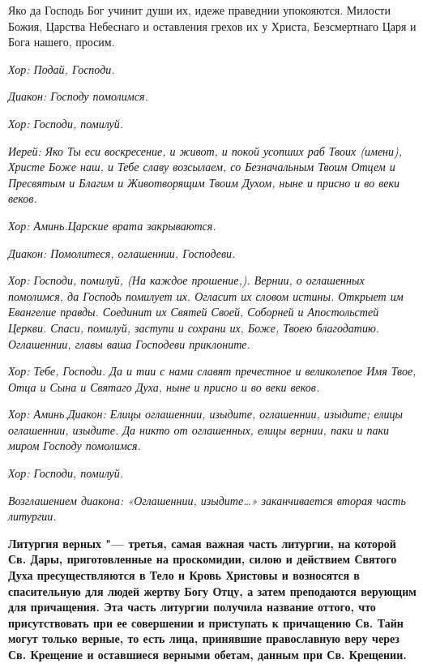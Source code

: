 Яко да Господь Бог учинит души их, идеже праведнии упокояются. Милости Божия, Царства Небеснаго и оставления грехов их у Христа, Безсмертнаго Царя и Бога нашего, просим.


\itshape Хор:\normalfont{} Подай, Господи.


\itshape Диакон:\normalfont{} Господу помолимся.


\itshape Хор:\normalfont{} Господи, помилуй.


\itshape Иерей:\normalfont{} Яко Ты еси воскресение, и живот, и покой усопших раб Твоих \itshape (имени)\normalfont{}, Христе Боже наш, и Тебе славу возсылаем, со Безначальным Твоим Отцем и Пресвятым и Благим и Животворящим Твоим Духом, ныне и присно и во веки веков.


\itshape Хор\normalfont{}: Аминь.\itshape  Царские врата закрываются.\normalfont{}




\itshape Диакон:\normalfont{} Помолитеся, оглашеннии, Господеви.


\itshape Хор:\normalfont{} Господи, помилуй, \itshape (На каждое прошение,)\normalfont{}. Вернии, о оглашенных помолимся, да Господь помилует их. Огласит их словом истины. Открыет им Евангелие правды. Соединит их Святей Своей, Соборней и Апостольстей Церкви. Спаси, помилуй, заступи и сохрани их, Боже, Твоею благодатию. Оглашеннии, главы ваша Господеви приклоните.


\itshape Хор:\normalfont{} Тебе, Господи. Да и тии с нами славят пречестное и великолепое Имя Твое, Отца и Сына и Святаго Духа, ныне и присно и во веки веков.


\itshape Хор:\normalfont{} Аминь.\itshape  Диакон:\normalfont{} Елицы оглашеннии, изыдите, оглашеннии, изыдите; елицы оглашеннии, изыдите. Да никто от оглашенных, елицы вернии, паки и паки миром Господу помолимся.


\itshape Хор:\normalfont{} Господи, помилуй.


\itshape Возглашением диакона: «Оглашеннии, изыдите…» заканчивается вторая часть литургии.\normalfont{}\mychapterending

 


\bfseries Литургия верных\normalfont{} "--- третья, самая важная часть литургии, на которой Св. Дары, приготовленные на проскомидии, силою и действием Святого Духа пресуществляются в Тело и Кровь Христовы и возносятся в спасительную для людей жертву Богу Отцу, а затем преподаются верующим для причащения. Эта часть литургии получила название оттого, что присутствовать при ее совершении и приступать к причащению Св. Тайн могут только верные, то есть лица, принявшие православную веру через Св. Крещение и оставшиеся верными обетам, данным при Св. Крещении.



